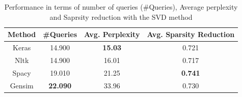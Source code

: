 \begin{table}[h!]
    \centering
    \begin{adjustbox}{max width=\textwidth}
    \begin{tabular}{|c|c|c|c|}
        \hline
        \bfseries{Method} & \bfseries{\#Queries} & \bfseries{Avg. Perplexity} &\bfseries{Avg. Sparsity Reduction}\\
        \hline
        \hline
        Keras & 14.900 & \bfseries{15.03} & 0.721\\
        \hline
        Nltk & 14.900 & 16.01 & 0.717\\
        \hline
        Spacy & 19.010 & 21.25 & \bfseries{0.741}\\
        \hline
        Gensim & \bfseries{22.090} & 33.96 & 0.730\\
        \hline
    \end{tabular}
    \end{adjustbox}
    \caption{Performance in terms of number of queries (\#Queries), Average perplexity and Saprsity reduction with the SVD method}
    \label{performance}
\end{table}
